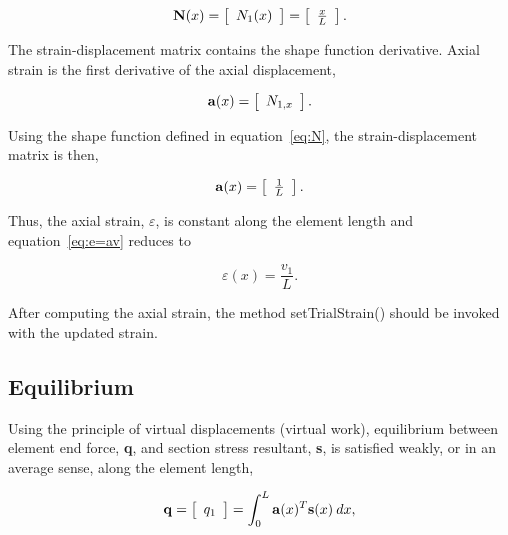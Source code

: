 \documentclass[12pt]{article}
\begin{document}
\begin{equation}
\label{eq:N}
{\bf N}(x) =
\left[ \begin{array}{c} N_1(x) \end{array} \right] =
\left[ \begin{array}{c} \frac{x}{L} \end{array}
\right].
\end{equation}

\noindent The strain-displacement matrix contains the shape function derivative.
Axial strain is the first derivative of the axial displacement,

\begin{equation}
{\bf a}(x) = \left[ \begin{array}{c}
N_{1,x} \end{array}
\right].
\end{equation}

\noindent Using the shape function defined in equation~\ref{eq:N}, the
strain-displacement matrix is then,

\begin{equation}
{\bf a}(x) = \left[ \begin{array}{c} \frac{1}{L}
\end{array}
\right].
\end{equation}

\noindent Thus, the axial strain, $\varepsilon$, is constant along the element
length and equation~\ref{eq:e=av} reduces to

\begin{equation}
\varepsilon(x) = \frac{v_1}{L}.
\end{equation}

After computing the axial strain, the method setTrialStrain() should be invoked
with the updated strain.

\subsection{Equilibrium}
Using the principle of virtual displacements (virtual work),
equilibrium between element end force, {\bf q}, and section stress
resultant, {\bf s},
is satisfied weakly, or in an average sense, along the element length,

\begin{equation}
\label{eq:q}
{\bf q} =  \left[ \begin{array}{c} q_1 \end{array} \right] =
\int_0^L {\bf a}(x)^T {\bf s}(x) \: dx,
\end{equation}
\end{document}
